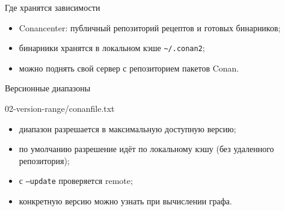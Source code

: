 \documentclass[compress, 8pt, aspectratio=169]{beamer}
\begin{document}
\begin{frame}{Где хранятся зависимости}

  \begin{itemize}

    \item Conancenter\footnotemark{}:
      публичный репозиторий рецептов\footnotemark{}%
      и готовых бинарников;

    \item бинарники хранятся в локальном кэше
      \texttt{\textasciitilde/.conan2};

    \item можно поднять свой сервер с репозиторием пакетов Conan.

  \end{itemize}

\end{frame}

\begin{frame}[fragile]{Версионные диапазоны}

    {02-version-range/conanfile.txt}

  \bigbreak

  \begin{itemize}

    \item диапазон разрешается в максимальную доступную версию;

    \item по умолчанию разрешение идёт по локальному кэшу (без удаленного
      репозитория);

    \item с \texttt{--update} проверяется remote;

    \item конкретную версию можно узнать при вычислении графа.

  \end{itemize}

\end{frame}
\end{document}
